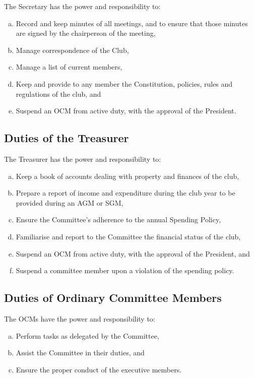 \documentclass[a4paper,12pt]{article}
\begin{document}
The Secretary has the power and responsibility to:

\begin{enumerate}[a)]
	\item Record and keep minutes of all meetings, and to ensure that those minutes are signed by the chairperson of the meeting,
	\item Manage correspondence of the Club,
	\item Manage a list of current members,
	\item Keep and provide to any member the Constitution, policies, rules and regulations of the club, and
	\item Suspend an OCM from active duty, with the approval of the President.
\end{enumerate}

\subsection{Duties of the Treasurer}

The Treasurer has the power and responsibility to:

\begin{enumerate}[a)]
	\item Keep a book of accounts dealing with property and finances of the club,
	\item Prepare a report of income and expenditure during the club year to be provided during an AGM or SGM,
	\item Ensure the Committee's adherence to the annual Spending Policy,
	\item Familiarise and report to the Committee the financial status of the club,
	\item Suspend an OCM from active duty, with the approval of the President, and
	\item Suspend a committee member upon a violation of the spending policy.
\end{enumerate}

\subsection{Duties of Ordinary Committee Members}

The OCMs have the power and responsibility to:

\begin{enumerate}[a)]
	\item Perform tasks as delegated by the Committee,
	\item Assist the Committee in their duties, and
	\item Ensure the proper conduct of the executive members.
\end{enumerate}
\end{document}
